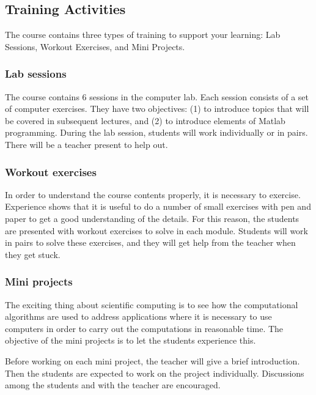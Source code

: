 \documentclass[a4paper,12pt]{article}
\begin{document}
\subsection*{Training Activities}
\setlength{\leftskip}{1em}

The course contains three types of training to support your learning: Lab Sessions, Workout Exercises, and Mini Projects.

\subsubsection*{Lab sessions}
The course contains 6 sessions in the computer lab. Each session consists of a
set of computer exercises. They have two objectives: (1) to introduce topics that
will be covered in subsequent lectures, and (2) to introduce elements of Matlab
programming. During the lab session, students will work individually or in
pairs. There will be a teacher present to help out. 

\subsubsection*{Workout exercises}

In order to understand the course contents properly, it is necessary to exercise.
Experience shows that it is useful to do a number of small exercises with pen
and paper to get a good understanding of the details. For this reason, the
students are presented with workout exercises to solve in each module. Students
will work in pairs to solve these exercises, and they will get help from the
teacher when they get stuck. 

\subsubsection*{Mini projects}

The exciting thing about scientific computing is to see how the computational
algorithms are used to address applications where it is necessary to use
computers in order to carry out the computations in reasonable time. The
objective of the mini projects is to let the students experience this.

Before working on each mini project, the teacher will give a brief introduction.
Then the students are expected to work on the project individually. Discussions
among the students and with the teacher are encouraged.


\setlength{\leftskip}{0em}
\end{document}
